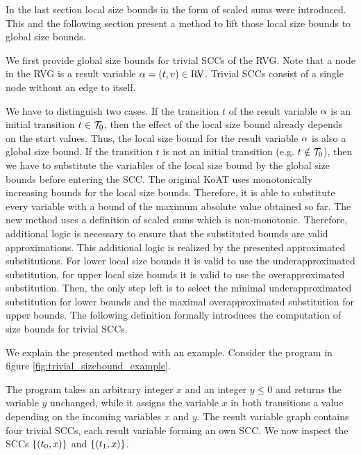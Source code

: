 In the last section local size bounds in the form of scaled sums were introduced.
This and the following section present a method to lift those local size bounds to global size bounds.

We first provide global size bounds for trivial SCCs of the RVG.
Note that a node in the RVG is a result variable $\alpha = (t,v) \in \text{RV}$.
Trivial SCCs consist of a single node without an edge to itself.

We have to distinguish two cases.
If the transition $t$ of the result variable $\alpha$ is an initial transition $t \in \mathcal{T}_0$, then the effect of the local size bound already depends on the start values.
Thus, the local size bound for the result variable $\alpha$ is also a global size bound.
If the transition $t$ is not an initial transition (e.g. $t \notin \mathcal{T}_0$), then we have to substitute the variables of the local size bound by the global size bounds before entering the SCC.
The original KoAT uses monotonically increasing bounds for the local size bounds.
Therefore, it is able to substitute every variable with a bound of the maximum absolute value obtained so far.
The new method uses a definition of scaled sums which is non-monotonic.
Therefore, additional logic is necessary to ensure that the substituted bounds are valid approximations.
This additional logic is realized by the presented approximated substitutions.
For lower local size bounds it is valid to use the underapproximated substitution, for upper local size bounds it is valid to use the overapproximated substitution.
Then, the only step left is to select the minimal underapproximated substitution for lower bounds and the maximal overapproximated substitution for upper bounds.
The following definition formally introduces the computation of size bounds for trivial SCCs.



We explain the presented method with an example.
Consider the program in figure \ref{fig:trivial_sizebound_example}.



The program takes an arbitrary integer $x$ and an integer $y \leq 0$ and returns the variable $y$ unchanged, while it assigns the variable $x$ in both transitions a value depending on the incoming variables $x$ and $y$.
The result variable graph contains four trivial SCCs, each result variable forming an own SCC.
We now inspect the SCCs $\lbrace (t_0,x) \rbrace$ and $\lbrace (t_1,x) \rbrace$.

